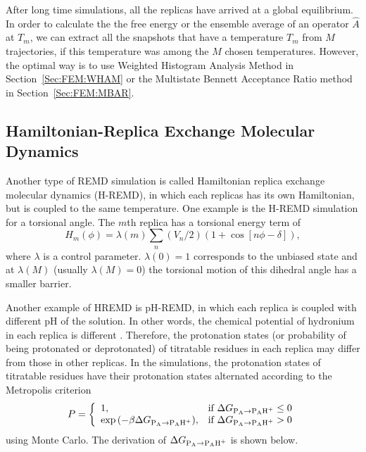 After long time simulations, all the replicas have arrived at a global equilibrium. In order to calculate the the free energy or the ensemble average of an operator $\hat A$ at $T_m$, we can extract all the snapshots that have a temperature $T_m$ from $M$ trajectories, if this temperature was among the $M$ chosen temperatures. However, the optimal way is to use Weighted Histogram Analysis Method in Section~\ref{Sec:FEM:WHAM} or the Multistate Bennett Acceptance Ratio method in Section~\ref{Sec:FEM:MBAR}.  

\subsection{Hamiltonian-Replica Exchange Molecular Dynamics\label{Sec:ES:REMD:HREMD}}
Another type of REMD simulation is called Hamiltonian replica exchange molecular dynamics (H-REMD), in which each replicas has its own Hamiltonian, but is coupled to the same temperature.\cite{JangPRL2003} One example is the H-REMD simulation for a torsional angle. The $m$th replica has a torsional energy term of 
\begin{equation}
	H_m(\phi)=\lambda(m)\sum_n\left(V_n/2\right)\left(1+\cos{\left[n\phi-\delta\right]}\right),
\end{equation}
where $\lambda$ is a control parameter. $\lambda(0)=1$ corresponds to the unbiased state and at $\lambda(M)$ (usually $\lambda(M)=0$) the torsional motion of this dihedral angle has a smaller barrier.

Another example of HREMD is pH-REMD, in which each replica is coupled with different pH of the solution. In other words, the chemical potential of hydronium in each replica is different . Therefore, the protonation states (or probability of being protonated or deprotonated) of titratable residues in each replica may differ from those in other replicas. In the simulations, the protonation states of titratable residues have their protonation states alternated according to the Metropolis criterion
\begin{equation}
	P= 
	\left\{ 
	\begin{array}{ll} 
		1, & \text{if } \Delta G_{\ce{P_{A}}\rightarrow \ce{P_{A}H^{+}}}\leq 0\\ 
		\exp{(-\beta\Delta G_{\ce{P_{A}}\rightarrow \ce{P_{A}H^{+}}})}, & \text{if }\Delta G_{\ce{P_{A}}\rightarrow \ce{P_{A}H^{+}}} >0\\  
	\end{array} 
	\right. 
\end{equation}
using Monte Carlo. The derivation of $\Delta G_{\ce{P_{A}}\rightarrow \ce{P_{A}H^{+}}}$ is shown below. 

